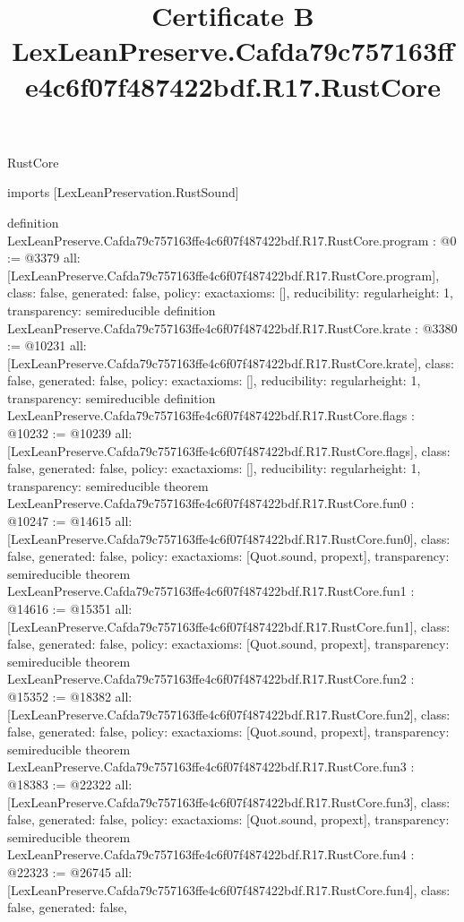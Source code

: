 \begin{lexlean}{RustCore}
\title{Certificate B LexLeanPreserve.Cafda79c757163ffe4c6f07f487422bdf.R17.RustCore}
\begin{coremodule}
imports [LexLeanPreservation.RustSound]

definition LexLeanPreserve.Cafda79c757163ffe4c6f07f487422bdf.R17.RustCore.program : @0 := @3379 {
  all: [LexLeanPreserve.Cafda79c757163ffe4c6f07f487422bdf.R17.RustCore.program],
  class: false,
  generated: false,
  policy: exact{axioms: []},
  reducibility: regular{height: 1},
  transparency: semireducible
}
definition LexLeanPreserve.Cafda79c757163ffe4c6f07f487422bdf.R17.RustCore.krate : @3380 := @10231 {
  all: [LexLeanPreserve.Cafda79c757163ffe4c6f07f487422bdf.R17.RustCore.krate],
  class: false,
  generated: false,
  policy: exact{axioms: []},
  reducibility: regular{height: 1},
  transparency: semireducible
}
definition LexLeanPreserve.Cafda79c757163ffe4c6f07f487422bdf.R17.RustCore.flags : @10232 := @10239 {
  all: [LexLeanPreserve.Cafda79c757163ffe4c6f07f487422bdf.R17.RustCore.flags],
  class: false,
  generated: false,
  policy: exact{axioms: []},
  reducibility: regular{height: 1},
  transparency: semireducible
}
theorem LexLeanPreserve.Cafda79c757163ffe4c6f07f487422bdf.R17.RustCore.fun0 : @10247 := @14615 {
  all: [LexLeanPreserve.Cafda79c757163ffe4c6f07f487422bdf.R17.RustCore.fun0],
  class: false,
  generated: false,
  policy: exact{axioms: [Quot.sound, propext]},
  transparency: semireducible
}
theorem LexLeanPreserve.Cafda79c757163ffe4c6f07f487422bdf.R17.RustCore.fun1 : @14616 := @15351 {
  all: [LexLeanPreserve.Cafda79c757163ffe4c6f07f487422bdf.R17.RustCore.fun1],
  class: false,
  generated: false,
  policy: exact{axioms: [Quot.sound, propext]},
  transparency: semireducible
}
theorem LexLeanPreserve.Cafda79c757163ffe4c6f07f487422bdf.R17.RustCore.fun2 : @15352 := @18382 {
  all: [LexLeanPreserve.Cafda79c757163ffe4c6f07f487422bdf.R17.RustCore.fun2],
  class: false,
  generated: false,
  policy: exact{axioms: [Quot.sound, propext]},
  transparency: semireducible
}
theorem LexLeanPreserve.Cafda79c757163ffe4c6f07f487422bdf.R17.RustCore.fun3 : @18383 := @22322 {
  all: [LexLeanPreserve.Cafda79c757163ffe4c6f07f487422bdf.R17.RustCore.fun3],
  class: false,
  generated: false,
  policy: exact{axioms: [Quot.sound, propext]},
  transparency: semireducible
}
theorem LexLeanPreserve.Cafda79c757163ffe4c6f07f487422bdf.R17.RustCore.fun4 : @22323 := @26745 {
  all: [LexLeanPreserve.Cafda79c757163ffe4c6f07f487422bdf.R17.RustCore.fun4],
  class: false,
  generated: false,
}
\end{coremodule}
\end{lexlean}

